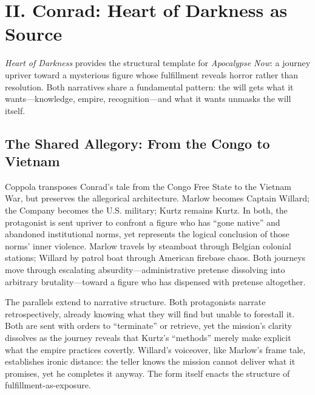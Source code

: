 \section*{II. Conrad: Heart of Darkness as Source}
\label{sec:ii-conrad}

\textit{Heart of Darkness} \parencite{ConradHOD1990} provides the structural template for
\textit{Apocalypse Now}: a journey upriver toward a mysterious figure whose fulfillment reveals
horror rather than resolution. Both narratives share a fundamental
pattern: the will gets what it wants---knowledge, empire, recognition---and what it wants
unmasks the will itself.

\subsection*{The Shared Allegory: From the Congo to Vietnam}
\label{ssec:the-shared-allegory}
Coppola transposes Conrad's tale from the Congo Free State to the Vietnam War, but preserves
the allegorical architecture. Marlow becomes Captain Willard; the Company becomes the U.S.
military; Kurtz remains Kurtz. In both, the protagonist is sent upriver to confront a figure
who has ``gone native'' and abandoned institutional norms, yet represents the logical
conclusion of those norms' inner violence. Marlow travels by steamboat through Belgian colonial
stations; Willard by patrol boat through American firebase chaos. Both journeys move through
escalating absurdity—administrative pretense dissolving into arbitrary brutality—toward a
figure who has dispensed with pretense altogether.

The parallels extend to narrative structure. Both protagonists narrate retrospectively, already
knowing what they will find but unable to forestall it. Both are sent with orders to
``terminate'' or retrieve, yet the mission's clarity dissolves as the journey reveals that
Kurtz's ``methods'' merely make explicit what the empire practices covertly. Willard's
voiceover, like Marlow's frame tale, establishes ironic distance: the teller knows the mission
cannot deliver what it promises, yet he completes it anyway. The form itself enacts the
structure of fulfillment-as-exposure.

